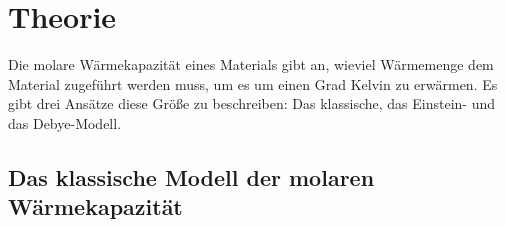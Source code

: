 \section{Theorie}
\label{sec:Theorie}



Die molare Wärmekapazität eines Materials gibt an, wieviel Wärmemenge dem Material zugeführt werden muss, um es um einen Grad Kelvin zu erwärmen.
Es gibt drei Ansätze diese Größe zu beschreiben: Das klassische, das Einstein- und das Debye-Modell.

\subsection{Das klassische Modell der molaren Wärmekapazität}

